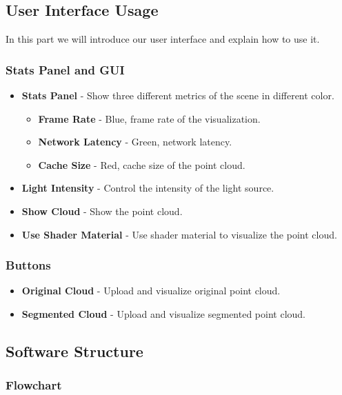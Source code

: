\documentclass[11pt, a4paper,oneside,chapterprefix=false]{scrbook}
\begin{document}
\subsection{User Interface Usage}

In this part we will introduce our user interface and explain how to use it.

\subsubsection{Stats Panel and GUI}

\begin{itemize}
	\item \textbf{Stats Panel} - Show three different metrics of the scene in different color.
		\begin{itemize}
			\item \textbf{Frame Rate} - Blue, frame rate of the visualization.
			\item \textbf{Network Latency} - Green, network latency.
			\item \textbf{Cache Size} - Red, cache size of the point cloud.
		\end{itemize}
	\item \textbf{Light Intensity} - Control the intensity of the light source.
	\item \textbf{Show Cloud} - Show the point cloud.
	\item \textbf{Use Shader Material} - Use shader material to visualize the point cloud.
\end {itemize}	

\subsubsection{Buttons}

\begin{itemize}
	\item \textbf{Original Cloud} - Upload and visualize original point cloud.
	\item \textbf{Segmented Cloud} - Upload and visualize segmented point cloud.
\end{itemize}

\subsection{Software Structure}

\subsubsection{Flowchart}
\end{document}
